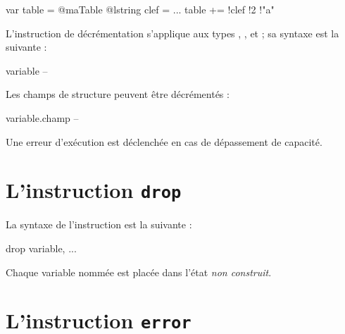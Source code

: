 \begin{galgascode}
var table = @maTable {}
@lstring clef = ...
table += !clef !2 !"a"
\end{galgascode}















L'instruction de décrémentation s'applique aux types , ,  et  ; sa syntaxe est la suivante :
\begin{galgascode}
variable --
\end{galgascode}

Les champs de structure peuvent être décrémentés :
\begin{galgascode}
variable.champ --
\end{galgascode}

Une erreur d'exécution est déclenchée en cas de dépassement de capacité.







\section{L'instruction \texttt{drop}}

La syntaxe de l'instruction  est la suivante :
{
\begin{galgascode}
drop variable, ...
\end{galgascode}
}

Chaque variable nommée est placée dans l'état \emph{non construit}.








\section{L'instruction \texttt{error}}

